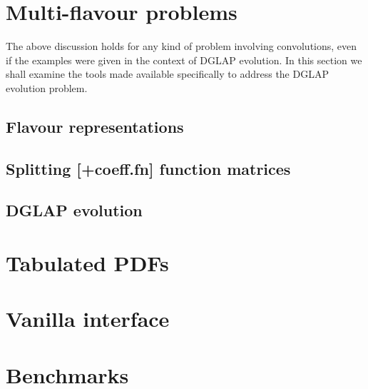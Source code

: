 \documentclass[12pt]{article}
\newcommand{\comment}[1]{\textbf{[#1]}}
\begin{document}
\section{Multi-flavour problems}
\label{sec:dglapstructs}

The above discussion holds for any kind of problem involving
convolutions, even if the examples were given in the context of DGLAP
evolution. In this section we shall examine the tools made available
specifically to address the DGLAP evolution problem.

\subsection{Flavour representations}
\label{sec:flav-repr}

\subsection{Splitting \comment{+coeff.fn} function matrices}
\label{sec:splitt-funct-matr}

\subsection{DGLAP evolution}
\label{sec:dglap-ev}

\section{Tabulated PDFs}
\label{sec:tabulated-pdfs}


\section{Vanilla interface}
\label{sec:vanilla}


\section{Benchmarks}
\label{sec:benchmarks}
\end{document}

